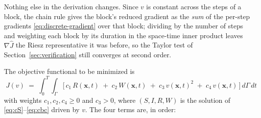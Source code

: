 \documentclass[11pt]{article}
\begin{document}
Nothing else in the derivation changes. Since $v$ is constant across the steps of a block, the chain rule gives the block's reduced gradient as the \emph{sum} of the per-step gradients \eqref{eq:discrete-gradient} over that block; dividing by the number of steps and weighting each block by its duration in the space-time inner product leaves $\nabla\hat J$ the Riesz representative it was before, so the Taylor test of Section~\ref{sec:verification} still converges at second order.

The objective functional to be minimized is
\begin{equation}
\boxed{\;J(v) \;=\; \int_0^T\!\!\int_\Gamma \Big[\,c_1\,R(\mathbf{x},t) \;+\; c_2\,W(\mathbf{x},t) \;+\; c_3\,v(\mathbf{x},t)^2 \;+\; c_4\,v(\mathbf{x},t)\,\Big]\,d\Gamma\,dt\;}
\label{eq:objective}
\end{equation}
with weights $c_1,c_2,c_4\ge 0$ and $c_3>0$, where $(S,I,R,W)$ is the solution of \eqref{eq:cS}--\eqref{eq:cbc} driven by $v$. The four terms are, in order:
\end{document}
